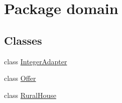 \hypertarget{namespacedomain}{}\section{Package domain}
\label{namespacedomain}
\subsection*{Classes}
\begin{DoxyCompactItemize}
\item 
class \mbox{\hyperlink{classdomain_1_1IntegerAdapter}{Integer\+Adapter}}
\item 
class \mbox{\hyperlink{classdomain_1_1Offer}{Offer}}
\item 
class \mbox{\hyperlink{classdomain_1_1RuralHouse}{Rural\+House}}
\end{DoxyCompactItemize}
